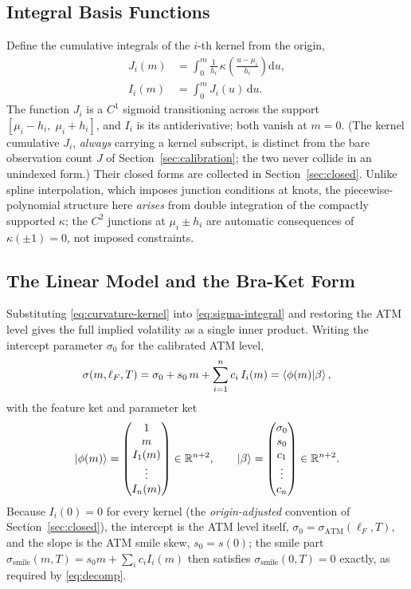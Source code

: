 \documentclass[11pt]{book}
\theoremstyle{plain}
\theoremstyle{definition}
\theoremstyle{remark}
\newcommand{\ket}[1]{\mathinner{\lvert #1 \rangle}}
\newcommand{\braket}[1]{\mathinner{\langle #1 \rangle}}
\newcommand{\parket}{\ket{\beta}}                %
\newcommand{\mln}{m}                             %
\newcommand{\lF}{\ell_F}                         %
\newcommand{\ssm}{\sigma_{\mathrm{smile}}}       %
\newcommand{\satm}{\sigma_{\mathrm{ATM}}}        %
\newcommand{\dd}{\mathrm{d}}                                  %
\begin{document}
\subsection{Integral Basis Functions}
\label{sec:integral-basis}

Define the cumulative integrals of the $i$-th kernel from the origin,
\begin{align}
J_i(\mln) &= \int_0^{\mln} \frac{1}{h_i}\,
\kappa\!\left(\frac{u - \mu_i}{h_i}\right)\dd u, \label{eq:Ji}\\
I_i(\mln) &= \int_0^{\mln} J_i(u)\,\dd u. \label{eq:Ii}
\end{align}
The function $J_i$ is a $C^1$ sigmoid transitioning across the support
$[\mu_i - h_i,\;\mu_i + h_i]$, and $I_i$ is its antiderivative; both vanish at
$\mln=0$. (The kernel cumulative $J_i$, \emph{always} carrying a kernel
subscript, is distinct from the bare observation count $J$ of
Section~\ref{sec:calibration}; the two never collide in an unindexed form.)
Their closed forms are collected in Section~\ref{sec:closed}. Unlike
spline interpolation, which imposes junction conditions at knots, the
piecewise-polynomial structure here \emph{arises} from double integration of
the compactly supported $\kappa$; the $C^2$ junctions at $\mu_i \pm h_i$ are
automatic consequences of $\kappa(\pm 1) = 0$, not imposed constraints.

\subsection{The Linear Model and the Bra-Ket Form}
\label{sec:linear-model}

Substituting \eqref{eq:curvature-kernel} into \eqref{eq:sigma-integral} and
restoring the ATM level gives the full implied volatility as a single inner
product. Writing the intercept parameter $\sigma_0$ for the calibrated ATM
level,
\begin{equation}\label{eq:sigma-linear}
\sigma(\mln,\lF,T)
= \sigma_0 + s_0\,\mln + \sum_{i=1}^n c_i\, I_i(\mln)
= \braket{\phi(\mln) | \beta},
\end{equation}
with the feature ket and parameter ket
\[
\ket{\phi(\mln)} = \begin{pmatrix} 1 \\ \mln \\ I_1(\mln) \\ \vdots \\ I_n(\mln)
\end{pmatrix} \in \mathbb{R}^{n+2},
\qquad
\parket = \begin{pmatrix} \sigma_0 \\ s_0 \\ c_1 \\ \vdots \\ c_n \end{pmatrix}
\in \mathbb{R}^{n+2}.
\]
Because $I_i(0)=0$ for every kernel (the \emph{origin-adjusted} convention of
Section~\ref{sec:closed}), the intercept is the ATM level itself,
$\sigma_0 = \satm(\lF,T)$, and the slope is the ATM smile skew, $s_0 = s(0)$;
the smile part $\ssm(\mln,T) = s_0\mln + \sum_i c_i I_i(\mln)$ then satisfies
$\ssm(0,T) = 0$ exactly, as required by \eqref{eq:decomp}.
\end{document}
